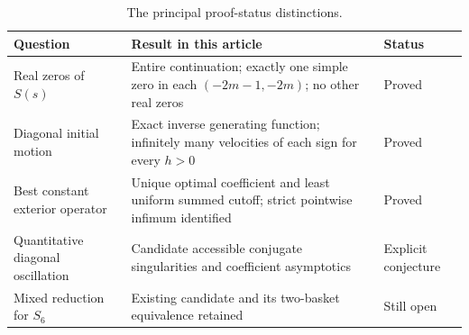 \begin{table}[htbp]
\centering
\small
\begin{tabularx}{\textwidth}{@{}p{}X p{}@{}}
\toprule
Question & Result in this article & Status\\
\midrule
Real zeros of $S(s)$ &
Entire continuation; exactly one simple zero in each
$(-2m-1,-2m)$; no other real zeros & Proved\\
Diagonal initial motion &
Exact inverse generating function; infinitely many velocities of each sign
for every $h>0$ & Proved\\
Best constant exterior operator &
Unique optimal coefficient and least uniform summed cutoff;
strict pointwise infimum identified & Proved\\
Quantitative diagonal oscillation &
Candidate accessible conjugate singularities and coefficient asymptotics
& Explicit conjecture\\
Mixed reduction for $S_6$ &
Existing candidate and its two-basket equivalence retained
& Still open\\
\bottomrule
\end{tabularx}
\caption{The principal proof-status distinctions.}
\label{tab:status}
\end{table}
